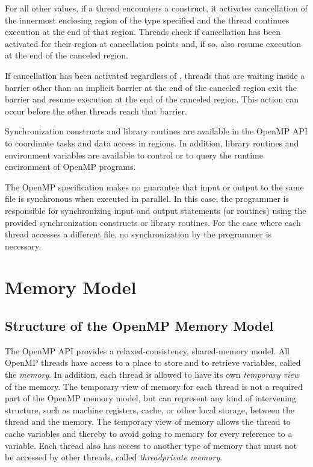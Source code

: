 For all other  values, if a 
thread encounters a  construct, it
activates cancellation of the innermost enclosing region of the type specified and the 
thread continues execution at the end of that region. Threads check if cancellation has 
been activated for their region at cancellation points and, if so, also resume execution at 
the end of the canceled region.

If cancellation has been activated regardless of , 
threads that are
waiting inside a barrier other than an implicit barrier at the end of the canceled region 
exit the barrier and resume execution at the end of the canceled region. This action can 
occur before the other threads reach that barrier.

Synchronization constructs and library routines are available in the OpenMP API to 
coordinate tasks and data access in  regions. In addition, library routines and
environment variables are available to control or to query the runtime environment of 
OpenMP programs.

The OpenMP specification makes no guarantee that input or output to the same file is 
synchronous when executed in parallel. In this case, the programmer is responsible for 
synchronizing input and output statements (or routines) using the provided 
synchronization constructs or library routines. For the case where each thread accesses a 
different file, no synchronization by the programmer is necessary.







\clearpage
\section{Memory Model}
\label{sec:Memory Model}
\subsection{Structure of the OpenMP Memory Model}
\label{subsec:Structure of the OpenMP Memory Model}
The OpenMP API provides a relaxed-consistency, shared-memory model. All OpenMP
threads have access to a place to store and to retrieve variables, 
called the \emph{memory}. In
addition, each thread is allowed to have its own \emph{temporary view} of the memory. The
temporary view of memory for each thread is not a required part of the OpenMP
memory model, but can represent any kind of intervening structure, such as machine
registers, cache, or other local storage, between the thread and the memory. The
temporary view of memory allows the thread to cache variables and thereby to avoid
going to memory for every reference to a variable. Each thread also has access to
another type of memory that must not be accessed by other threads, 
called \emph{threadprivate memory}.

